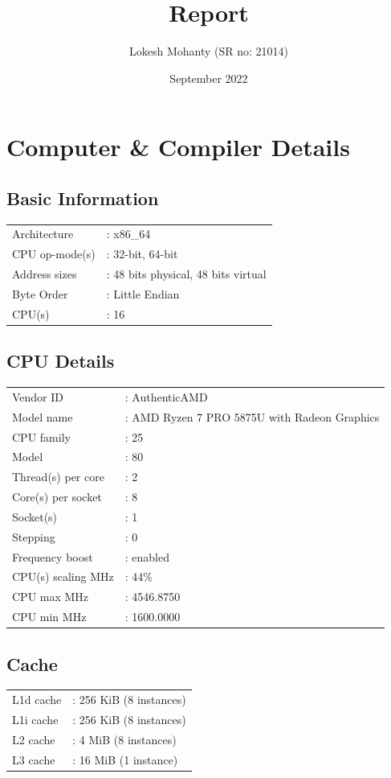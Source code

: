\documentclass[12pt, letterpaper]{article}
\title{Report}
\author{Lokesh Mohanty (SR no: 21014)}
\date{September 2022}
\begin{document}
\maketitle

\section{Computer \& Compiler Details}
\label{sec:comp}

\subsection{Basic Information}
\label{sec:basic}
\begin{tabular}{ll}
  Architecture    &: x86\_64\\
  CPU op-mode(s)  &: 32-bit, 64-bit\\
  Address sizes   &: 48 bits physical, 48 bits virtual\\
  Byte Order      &: Little Endian\\
  CPU(s)          &: 16\\
\end{tabular}

\subsection{CPU Details}
\label{sec:cpu}
\begin{tabular}{ll}
  Vendor ID       &: AuthenticAMD\\
  Model name            &: AMD Ryzen 7 PRO 5875U with Radeon Graphics\\
  CPU family            &: 25\\
  Model                 &: 80\\
  Thread(s) per core    &: 2\\
  Core(s) per socket    &: 8\\
  Socket(s)             &: 1\\
  Stepping              &: 0\\
  Frequency boost       &: enabled\\
  CPU(s) scaling MHz    &: 44\%\\
  CPU max MHz           &: 4546.8750\\
  CPU min MHz           &: 1600.0000\\
\end{tabular}

\subsection{Cache}
\label{sec:cache}
\begin{tabular}{ll}
  L1d cache  &: 256 KiB (8 instances)\\
  L1i cache  &: 256 KiB (8 instances)\\
  L2 cache   &: 4 MiB (8 instances)\\
  L3 cache   &: 16 MiB (1 instance)\\
\end{tabular}
\end{document}
